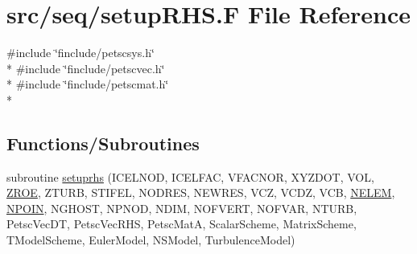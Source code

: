 \hypertarget{seq_2setup_r_h_s_8_f}{\section{src/seq/setup\-R\-H\-S.F File Reference}
\label{seq_2setup_r_h_s_8_f}
}
{\ttfamily \#include \char`\"{}finclude/petscsys.\-h\char`\"{}}\\*
{\ttfamily \#include \char`\"{}finclude/petscvec.\-h\char`\"{}}\\*
{\ttfamily \#include \char`\"{}finclude/petscmat.\-h\char`\"{}}\\*
\subsection*{Functions/\-Subroutines}
\begin{DoxyCompactItemize}
\item 
subroutine \hyperlink{seq_2setup_r_h_s_8_f_a718e288d437007ef5bc48b3f57941f65}{setuprhs} (I\-C\-E\-L\-N\-O\-D, I\-C\-E\-L\-F\-A\-C, V\-F\-A\-C\-N\-O\-R, X\-Y\-Z\-D\-O\-T, V\-O\-L, \hyperlink{myts_8com_a0c4fbcdb78e6b50c8919d714e4b5a694}{Z\-R\-O\-E}, Z\-T\-U\-R\-B, S\-T\-I\-F\-E\-L, N\-O\-D\-R\-E\-S, N\-E\-W\-R\-E\-S, V\-C\-Z, V\-C\-D\-Z, V\-C\-B, \hyperlink{mesh_8com_aee5e75b79d0e815c0603cfbccc618957}{N\-E\-L\-E\-M}, \hyperlink{mesh_8com_ae28c1572321efcd8715b974d87d20c58}{N\-P\-O\-I\-N}, N\-G\-H\-O\-S\-T, N\-P\-N\-O\-D, N\-D\-I\-M, N\-O\-F\-V\-E\-R\-T, N\-O\-F\-V\-A\-R, N\-T\-U\-R\-B, Petsc\-Vec\-D\-T, Petsc\-Vec\-R\-H\-S, Petsc\-Mat\-A, Scalar\-Scheme, Matrix\-Scheme, T\-Model\-Scheme, Euler\-Model, N\-S\-Model, Turbulence\-Model)
\end{DoxyCompactItemize}


